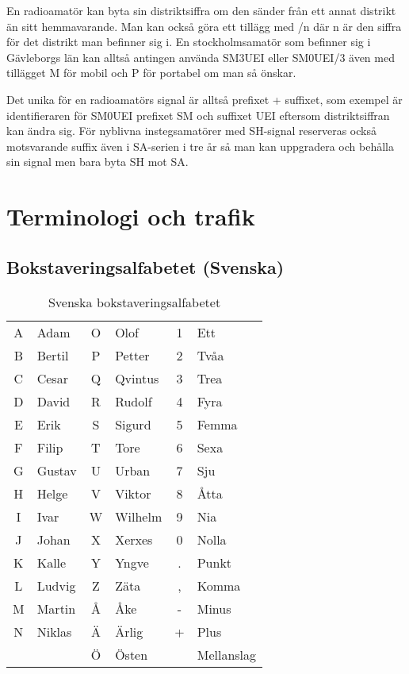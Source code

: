 En radioamatör kan byta sin distriktsiffra om den sänder från ett annat distrikt
än sitt hemmavarande. Man kan också göra ett tillägg med /n där n är den siffra
för det distrikt man befinner sig i. En stockholmsamatör som befinner sig i
Gävleborgs län kan alltså antingen använda SM3UEI eller SM0UEI/3 även med
tillägget M för mobil och P för portabel om man så önskar.

Det unika för en radioamatörs signal är alltså prefixet + suffixet, som
exempel är identifieraren för SM0UEI prefixet SM och suffixet UEI eftersom
distriktsiffran kan ändra sig. För nyblivna instegsamatörer med SH-signal
reserveras också motsvarande suffix även i SA-serien i tre år så man kan
uppgradera och behålla sin signal men bara byta SH mot SA.

\section{Terminologi och trafik}

\subsection{Bokstaveringsalfabetet (Svenska)}

\begin{table}[H]
	\centering
\begin{longtable}{cl|cl|cl }
	A & Adam   & O & Olof    & 1 & Ett        \\
	B & Bertil & P & Petter  & 2 & Tvåa       \\
	C & Cesar  & Q & Qvintus & 3 & Trea       \\
	D & David  & R & Rudolf  & 4 & Fyra       \\
	E & Erik   & S & Sigurd  & 5 & Femma      \\
	F & Filip  & T & Tore    & 6 & Sexa       \\
	G & Gustav & U & Urban   & 7 & Sju        \\
	H & Helge  & V & Viktor  & 8 & Åtta       \\
	I & Ivar   & W & Wilhelm & 9 & Nia        \\
	J & Johan  & X & Xerxes  & 0 & Nolla      \\
	K & Kalle  & Y & Yngve   & . & Punkt      \\
	L & Ludvig & Z & Zäta    & , & Komma      \\
	M & Martin & Å & Åke     & - & Minus      \\
	N & Niklas & Ä & Ärlig   & + & Plus       \\
	  &        & Ö & Östen   &   & Mellanslag \\
\end{longtable}
\caption{Svenska bokstaveringsalfabetet}
\end{table}

